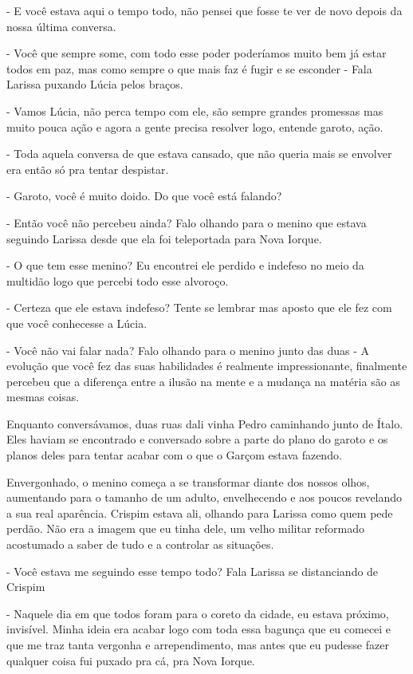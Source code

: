 - E você estava aqui o tempo todo, não pensei que fosse te ver de novo depois da nossa última conversa.

- Você que sempre some, com todo esse poder poderíamos muito bem já estar todos em paz, mas como sempre o que mais faz é fugir e se esconder - Fala Larissa puxando Lúcia pelos braços.

- Vamos Lúcia, não perca tempo com ele, são sempre grandes promessas mas muito pouca ação e agora a gente precisa resolver logo, entende garoto, ação.

- Toda aquela conversa de que estava cansado, que não queria mais se envolver era então só pra tentar despistar.

- Garoto, você é muito doido. Do que você está falando?

- Então você não percebeu ainda? Falo olhando para o menino que estava seguindo Larissa desde que ela foi teleportada para Nova Iorque.

- O que tem esse menino? Eu encontrei ele perdido e indefeso no meio da multidão logo que percebi todo esse alvoroço.

- Certeza que ele estava indefeso? Tente se lembrar mas aposto que ele fez com que você conhecesse a Lúcia.

- Você não vai falar nada? Falo olhando para o menino junto das duas - A evolução que você fez das suas habilidades é realmente impressionante, finalmente percebeu que a diferença entre a ilusão na mente e a mudança na matéria são as mesmas coisas.

Enquanto conversávamos, duas ruas dali vinha Pedro caminhando junto de Ítalo. Eles haviam se encontrado e conversado sobre a parte do plano do garoto e os planos deles para tentar acabar com o que o Garçom estava fazendo.

Envergonhado, o menino começa a se transformar diante dos nossos olhos, aumentando para o tamanho de um adulto, envelhecendo e aos poucos revelando a sua real aparência. Crispim estava ali, olhando para Larissa como quem pede perdão. Não era a imagem que eu tinha dele, um velho militar reformado acostumado a saber de tudo e a controlar as situações.

- Você estava me seguindo esse tempo todo? Fala Larissa se distanciando de Crispim

- Naquele dia em que todos foram para o coreto da cidade, eu estava próximo, invisível. Minha ideia era acabar logo com toda essa bagunça que eu comecei e que me traz tanta vergonha e arrependimento, mas antes que eu pudesse fazer qualquer coisa fui puxado pra cá, pra Nova Iorque.


